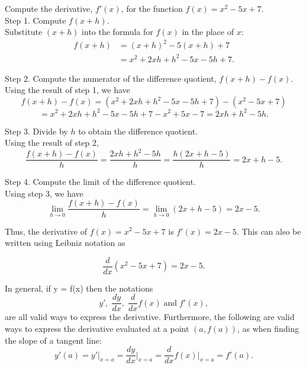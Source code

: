 \documentclass[handout]{ximera}
\begin{document}
\begin{example}[example 2]
Compute the derivative, $f'(x)$, for the function $f(x) = x^2 - 5x + 7$.  \\
Step 1. Compute $f(x+h)$. \\
Substitute $(x+h)$ into the formula for $f(x)$ in the place of $x$:  
\begin{align*}
f(x+h) &= (x+h)^2 - 5(x+h) + 7 \\
       &= x^2 + 2xh + h^2 - 5x -5h + 7.			
\end{align*}

Step 2. Compute the numerator of the difference quotient, $f(x+h) - f(x)$.\\
Using the result of step 1, we have
\[
f(x+h) - f(x) = \left(x^2 + 2xh + h^2 - 5x -5h + 7\right) - \left(x^2 - 5x + 7\right) 
\]
\[
= x^2 + 2xh + h^2 - 5x - 5h + 7 -x^2 + 5x - 7 = 2xh + h^2 - 5h.
\]

Step 3. Divide by $h$ to obtain the difference quotient. \\
Using the result of step 2,
\[
\frac{f(x+h) - f(x)}{h}	= \frac{2xh + h^2 - 5h}{h}	= \frac{h(2x + h - 5)}{h} = 2x + h -5.
\]

Step 4. Compute the limit of the difference quotient. \\
Using step 3, we have
\[
\lim_{h \to 0} \frac{f(x+h) - f(x)}{h}	= \lim_{h \to 0} (2x + h -5) = 2x - 5.
\]

Thus, the derivative of $f(x) = x^2 - 5x + 7$ is $f'(x) = 2x -5$. This can also be written using Leibniz notation as

\[
\frac{d}{dx} \left(x^2 - 5x + 7\right) = 2x-5.
\]
\end{example}



In general, if y = f(x) then the notations
\[
y' , \; \frac{dy}{dx},\; \frac{d}{dx} f(x) \; \text{and} \; f'(x),
\]
are all valid ways to express the derivative.
Furthermore, the following are valid ways to express the derivative evaluated at a point $(a, f(a))$, as when finding the slope of a tangent line:
\[
y'(a) = y' \big|_{x=a} = \frac{dy}{dx}\Big|_{x=a} = \frac{d}{dx} f(x)\Big|_{x=a} = f'(a).
\]
\end{document}
